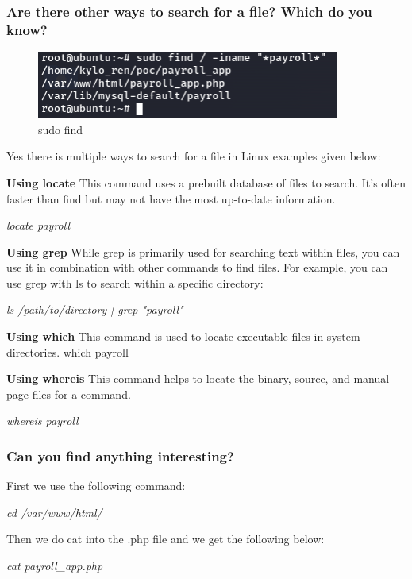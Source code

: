 \subsubsection{Are there other ways to search for a file? Which do you know?}
\begin{figure}[H]
    \centering
    \includegraphics[width=0.6\linewidth]{pic/sudo find.png}
    \caption{sudo find}
    \label{fig:sudo find}
\end{figure}

Yes there is multiple ways to search for a file in Linux examples given below:

\textbf{Using locate}
This command uses a prebuilt database of files to search. It's often faster than find
but may not have the most up-to-date information.

\textit{locate payroll}

\textbf{Using grep}
While grep is primarily used for searching text within files, you can use it in
combination with other commands to find files. For example, you can use grep with ls
to search within a specific directory:

\textit{ls /path/to/directory | grep "payroll"}

\textbf{Using which}
This command is used to locate executable files in system directories.
which payroll

\textbf{Using whereis}
This command helps to locate the binary, source, and manual page files for a
command.

\textit{whereis payroll}


\subsubsection{Can you find anything interesting?}
First we use the following command:

\textit{cd /var/www/html/}

Then we do cat into the .php file and we get the following below:

\textit{cat payroll\_app.php}

